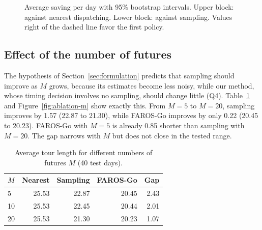 \documentclass[5p,times,authoryear]{elsarticle}
\begin{document}
\begin{figure}[t]
\centering
{}
\caption{Average saving per day with 95\% bootstrap intervals. Upper block: against nearest dispatching. Lower block: against sampling. Values right of the dashed line favor the first policy.}
\label{fig:paired}
\end{figure}

\subsection{Effect of the number of futures}
\label{sec:ablation-m}

The hypothesis of Section~\ref{sec:formulation} predicts that sampling should improve as $M$ grows, because its estimates become less noisy, while our method, whose timing decision involves no sampling, should change little (Q4). Table~\ref{tab:ablation-m} and Figure~\ref{fig:ablation-m} show exactly this. From $M=5$ to $M=20$, sampling improves by 1.57 (22.87 to 21.30), while FAROS-Go improves by only 0.22 (20.45 to 20.23). FAROS-Go with $M=5$ is already 0.85 shorter than sampling with $M=20$. The gap narrows with $M$ but does not close in the tested range.

\begin{table}[t]
\centering
\footnotesize
\caption{Average tour length for different numbers of futures $M$ (40 test days).}
\label{tab:ablation-m}
\begin{tabular}{@{}lrrrr@{}}
\toprule
$M$ & Nearest & Sampling & FAROS-Go & Gap \\
\midrule
5  & 25.53 & 22.87 & 20.45 & 2.43 \\
10 & 25.53 & 22.45 & 20.44 & 2.01 \\
20 & 25.53 & 21.30 & 20.23 & 1.07 \\
\bottomrule
\end{tabular}
\end{table}
\end{document}
